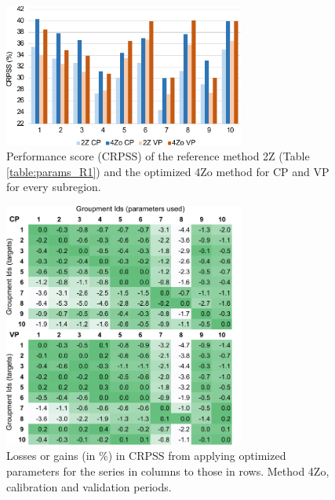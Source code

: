 \documentclass[review]{elsarticle}
\providecommand{\DIFaddtex}[1]{{\protect\color{blue}\uwave{#1}}} %
\providecommand{\DIFaddFL}[1]{\DIFadd{#1}} %
\providecommand{\DIFaddbeginFL}{} %
\providecommand{\DIFaddendFL}{} %
\providecommand{\DIFdelbeginFL}{} %
\providecommand{\DIFdelendFL}{} %
\providecommand{\DIFadd}[1]{\texorpdfstring{\DIFaddtex{#1}}{#1}} %
\begin{document}
\begin{figure}[t]
	\DIFdelbeginFL %
\DIFdelendFL \DIFaddbeginFL \centerline{\includegraphics[width=7.9cm]{fig04.pdf}}
	\DIFaddendFL \caption{Performance score (CRPSS) of the reference method 2Z (Table \ref{table:params_R1}) and the optimized 4Zo method for \DIFaddbeginFL \DIFaddFL{the }\DIFaddendFL CP and VP for every subregion.}
	\label{fig:figure_crpss_4Zo}
\end{figure}

\begin{figure}[t]
	\DIFdelbeginFL %
\DIFdelendFL \DIFaddbeginFL \centerline{\includegraphics[width=7.9cm]{fig05.pdf}}
	\DIFaddendFL \caption{Losses or gains (in \%) in CRPSS from applying optimized parameters for the series in columns to those in rows. Method 4Zo, calibration and validation periods.}
	\label{fig:crossing_4Zo}
\end{figure}
\end{document}
